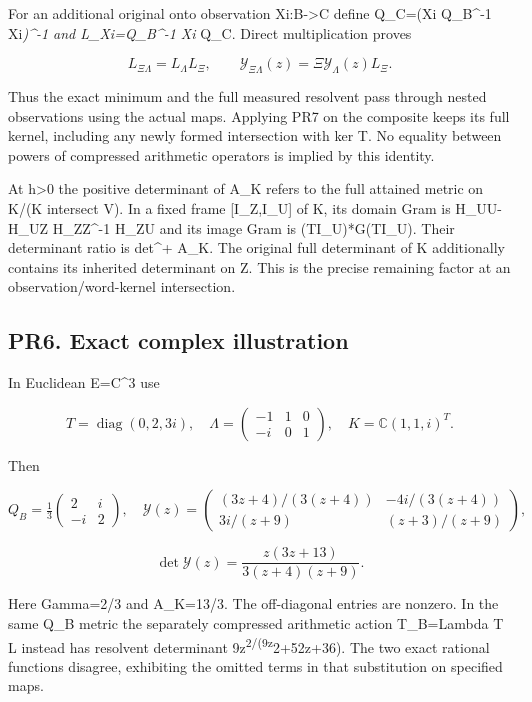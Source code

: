 \documentclass[11pt]{article}
\begin{document}
For an additional original onto observation Xi:B-\textgreater C define Q\_C=(Xi Q\_B\^{}-1 Xi\emph{)\^{}-1 and L\_Xi=Q\_B\^{}-1 Xi} Q\_C. Direct multiplication proves

\[
L_{\Xi\Lambda}=L_\Lambda L_\Xi,\qquad
\mathscr Y_{\Xi\Lambda}(z)=\Xi\mathscr Y_\Lambda(z)L_\Xi.
\tag{PR15a}
\]

Thus the exact minimum and the full measured resolvent pass through nested observations using the actual maps. Applying PR7 on the composite keeps its full kernel, including any newly formed intersection with ker T. No equality between powers of compressed arithmetic operators is implied by this identity.

At h\textgreater0 the positive determinant of A\_K refers to the full attained metric on K/(K intersect V). In a fixed frame {[}I\_Z,I\_U{]} of K, its domain Gram is H\_UU-H\_UZ H\_ZZ\^{}-1 H\_ZU and its image Gram is (TI\_U)*G(TI\_U). Their determinant ratio is det\^{}+ A\_K. The original full determinant of K additionally contains its inherited determinant on Z. This is the precise remaining factor at an observation/word-kernel intersection.

\subsection{PR6. Exact complex illustration}\label{pr6.-exact-complex-illustration}

In Euclidean E=C\^{}3 use

\[
T=\operatorname{diag}(0,2,3i),\quad
\Lambda=\begin{pmatrix}-1&1&0\\-i&0&1\end{pmatrix},\quad
K=\mathbb C(1,1,i)^T.
\]

Then

\[
Q_B=\tfrac13\begin{pmatrix}2&i\\-i&2\end{pmatrix},\quad
\mathscr Y(z)=
\begin{pmatrix}
(3z+4)/(3(z+4))&-4i/(3(z+4))\\
3i/(z+9)&(z+3)/(z+9)
\end{pmatrix},
\]

\[
\boxed{\det\mathscr Y(z)=\frac{z(3z+13)}{3(z+4)(z+9)}.}
\tag{PR16}
\]

Here Gamma=2/3 and A\_K=13/3. The off-diagonal entries are nonzero. In the same Q\_B metric the separately compressed arithmetic action T\_B=Lambda T L instead has resolvent determinant 9z\textsuperscript{2/(9z}2+52z+36). The two exact rational functions disagree, exhibiting the omitted terms in that substitution on specified maps.
\end{document}
